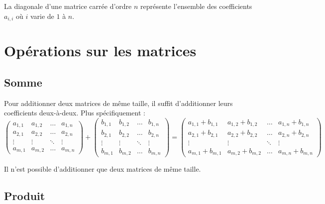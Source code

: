	\begin{tip}
		La diagonale d'une matrice carrée d'ordre $n$ représente l'ensemble des coefficients $a_{i,i}$ où $i$ varie de $1$ à $n$.
	\end{tip}

	\section{Opérations sur les matrices}

	\subsection{Somme}

	\begin{formula}
		\contentwidth[big]
		Pour additionner deux matrices de même taille, il suffit d'additionner leurs coefficients deux-à-deux. Plus spécifiquement :
		\[ \begin{pmatrix}a_{1,1} & a_{1,2} & \dots & a_{1,n} \\ a_{2,1} & a_{2,2} & \dots & a_{2,n} \\ \vdots & \vdots & \ddots & \vdots \\ a_{m,1} & a_{m,2} & \dots & a_{m,n}\end{pmatrix} + \begin{pmatrix}b_{1,1} & b_{1,2} & \dots & b_{1,n} \\ b_{2,1} & b_{2,2} & \dots & b_{2,n} \\ \vdots & \vdots & \ddots & \vdots \\ b_{m,1} & b_{m,2} & \dots & b_{m,n}\end{pmatrix} = \begin{pmatrix}a_{1,1} + b_{1,1} & a_{1,2} + b_{1,2} & \dots & a_{1,n} + b_{1,n} \\ a_{2,1} + b_{2,1} & a_{2,2} + b_{2,2} & \dots & a_{2,n} + b_{2,n} \\ \vdots & \vdots & \ddots & \vdots \\ a_{m,1} + b_{m,1} & a_{m,2} + b_{m,2} & \dots & a_{m,n} + b_{m,n}\end{pmatrix} \]
	\end{formula}

	\begin{tip}[Attention !]
		Il n'est possible d'additionner que deux matrices de même taille.
	\end{tip}

	\subsection{Produit}

